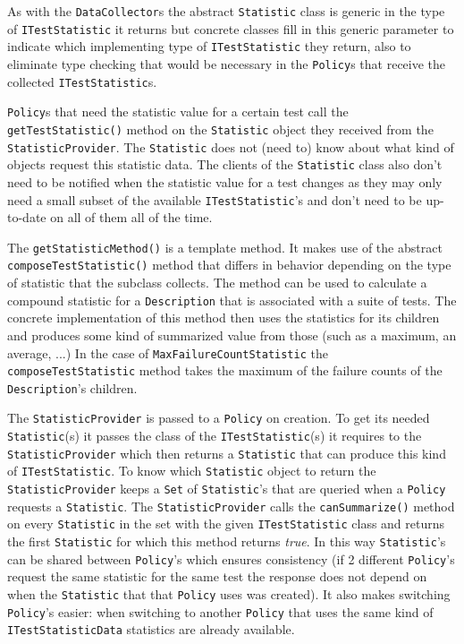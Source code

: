 \documentclass[i2]{oss}
\newcommand{\class}[1]{\texttt{#1}}
\newcommand{\method}[1]{\texttt{#1}}
\begin{document}
As with the \class{DataCollector}s the abstract \class{Statistic} class
is generic in the type of \class{ITestStatistic} it returns but concrete
classes fill in this generic parameter to indicate which implementing
type of \class{ITestStatistic} they return, also to eliminate type 
checking that would be necessary in the \class{Policy}s that receive
the collected \class{ITestStatistic}s.

\class{Policy}s that need the statistic value for a certain test call
the \method{getTestStatistic()} method on the \class{Statistic} object
they received from the \class{StatisticProvider}.
The \class{Statistic} does not (need to) know about what kind of objects
request this statistic data.
The clients of the \class{Statistic} class also don't need to be 
notified when the statistic value for a test changes as they may only
need a small subset of the available \class{ITestStatistic}'s and don't
need to be up-to-date on all of them all of the time.

The \method{getStatisticMethod()} is a template method.
It makes use of the abstract \method{composeTestStatistic()} method 
that differs in behavior depending on the type of statistic that the
subclass collects.
The method can be used to calculate a compound statistic for a 
\class{Description} that is associated with a suite of tests.
The concrete implementation of this method then uses the statistics for
its children and produces some kind of summarized value from those (such
as a maximum, an average, ...)
In the case of \class{MaxFailureCountStatistic} the 
\method{composeTestStatistic} method takes the maximum of the failure
counts of the \class{Description}'s children.

The \class{StatisticProvider} is passed to a \class{Policy} on creation.
To get its needed \class{Statistic}(s) it passes the class of the 
\class{ITestStatistic}(s) it requires to the \class{StatisticProvider}
which then returns a \class{Statistic} that can produce this kind of
\class{ITestStatistic}.
To know which \class{Statistic} object to return the 
\class{StatisticProvider} keeps a \class{Set} of \class{Statistic}'s 
that are queried when a \class{Policy} requests a \class{Statistic}.
The \class{StatisticProvider} calls the \method{canSummarize()} method
on every \class{Statistic} in the set with the given 
\class{ITestStatistic} class and returns the first \class{Statistic}
for which this method returns \emph{true}.
In this way \class{Statistic}'s can be shared between \class{Policy}'s
which ensures consistency (if 2 different \class{Policy}'s request the
same statistic for the same test the response does not depend on when
the \class{Statistic} that that \class{Policy} uses was created).
It also makes switching \class{Policy}'s easier: when switching to 
another \class{Policy} that uses the same kind of 
\class{ITestStatisticData} statistics are already available.
\end{document}

